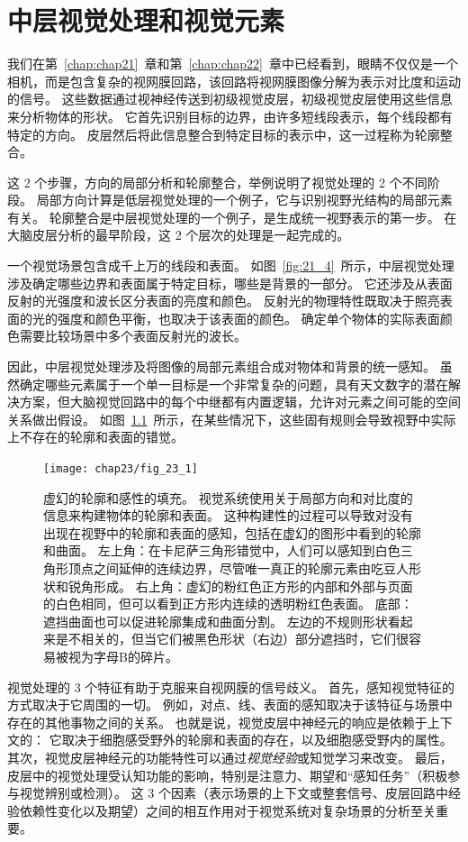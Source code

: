 \chapter{中层视觉处理和视觉元素} \label{chap:chap23}

我们在第~\ref{chap:chap21}~章和第~\ref{chap:chap22}~章中已经看到，眼睛不仅仅是一个相机，而是包含复杂的视网膜回路，该回路将视网膜图像分解为表示对比度和运动的信号。
这些数据通过视神经传送到初级视觉皮层，初级视觉皮层使用这些信息来分析物体的形状。
它首先识别目标的边界，由许多短线段表示，每个线段都有特定的方向。
皮层然后将此信息整合到特定目标的表示中，这一过程称为轮廓整合。


这 2 个步骤，方向的局部分析和轮廓整合，举例说明了视觉处理的 2 个不同阶段。
局部方向计算是低层视觉处理的一个例子，它与识别视野光结构的局部元素有关。
轮廓整合是中层视觉处理的一个例子，是生成统一视野表示的第一步。
在大脑皮层分析的最早阶段，这 2 个层次的处理是一起完成的。
 

一个视觉场景包含成千上万的线段和表面。
如图~\ref{fig:21_4}~所示，中层视觉处理涉及确定哪些边界和表面属于特定目标，哪些是背景的一部分。
它还涉及从表面反射的光强度和波长区分表面的亮度和颜色。
反射光的物理特性既取决于照亮表面的光的强度和颜色平衡，也取决于该表面的颜色。
确定单个物体的实际表面颜色需要比较场景中多个表面反射光的波长。


因此，中层视觉处理涉及将图像的局部元素组合成对物体和背景的统一感知。
虽然确定哪些元素属于一个单一目标是一个非常复杂的问题，具有天文数字的潜在解决方案，但大脑视觉回路中的每个中继都有内置逻辑，允许对元素之间可能的空间关系做出假设。
如图~\ref{fig:23_1}~所示，在某些情况下，这些固有规则会导致视野中实际上不存在的轮廓和表面的错觉。


\begin{figure}[htbp]
	\centering
	\texttt{[image: chap23/fig\_23\_1]}
	\caption{虚幻的轮廓和感性的填充。
		视觉系统使用关于局部方向和对比度的信息来构建物体的轮廓和表面。
		这种构建性的过程可以导致对没有出现在视野中的轮廓和表面的感知，包括在虚幻的图形中看到的轮廓和曲面。
		左上角：在卡尼萨三角形错觉中，人们可以感知到白色三角形顶点之间延伸的连续边界，尽管唯一真正的轮廓元素由吃豆人形状和锐角形成。
		右上角：虚幻的粉红色正方形的内部和外部与页面的白色相同，但可以看到正方形内连续的透明粉红色表面。
		底部：遮挡曲面也可以促进轮廓集成和曲面分割。
		左边的不规则形状看起来是不相关的，但当它们被黑色形状（右边）部分遮挡时，它们很容易被视为字母B的碎片。}
	\label{fig:23_1}
\end{figure}


视觉处理的 3 个特征有助于克服来自视网膜的信号歧义。
首先，感知视觉特征的方式取决于它周围的一切。
例如，对点、线、表面的感知取决于该特征与场景中存在的其他事物之间的关系。
也就是说，视觉皮层中神经元的响应是依赖于上下文的：
它取决于细胞感受野外的轮廓和表面的存在，以及细胞感受野内的属性。
其次，视觉皮层神经元的功能特性可以通过\textit{视觉经验}或知觉学习来改变。
最后，皮层中的视觉处理受认知功能的影响，特别是注意力、期望和“感知任务”（积极参与视觉辨别或检测）。
这 3 个因素（表示场景的上下文或整套信号、皮层回路中经验依赖性变化以及期望）之间的相互作用对于视觉系统对复杂场景的分析至关重要。


